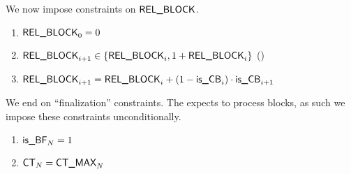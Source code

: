 We now impose constraints on $\textsf{REL\_BLOCK}$.
\begin{enumerate}[resume]
	\item $\textsf{REL\_BLOCK} _{0} = 0$
	\item $\textsf{REL\_BLOCK}_{i + 1} \in \{ \textsf{REL\_BLOCK}_{i}, 1 + \textsf{REL\_BLOCK}_{i} \}$ \quad (\sanityCheck)
	\item $\textsf{REL\_BLOCK} _{i + 1} = \textsf{REL\_BLOCK} _{i} + (1 - \textsf{is\_CB} _{i}) \cdot \textsf{is\_CB} _{i + 1}$
\end{enumerate}
We end on ``finalization'' constraints.
The \zkEvm{} expects to process blocks, as such we impose these constraints unconditionally.
\begin{enumerate}[resume]
	\item $\textsf{is\_BF}  _{N} = 1$
	\item $\textsf{CT} _{N} = \textsf{CT\_MAX} _{N}$
\end{enumerate}
